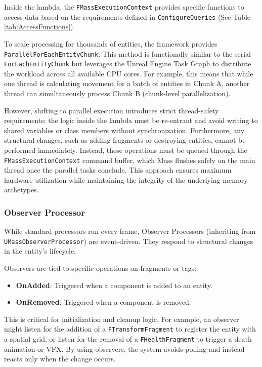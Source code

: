 Inside the lambda, the \texttt{FMassExecutionContext} provides specific functions to access data based on the requirements defined in \texttt{ConfigureQueries} (See Table \ref{tab:AccessFunctions}).

To scale processing for thousands of entities, the framework provides \\ \texttt{ParallelForEachEntityChunk}. This method is functionally similar to the serial \texttt{ForEachEntityChunk} but leverages the Unreal Engine Task Graph to distribute the workload across all available CPU cores. For example, this means that while one thread is calculating movement for a batch of entities in Chunk A, another thread can simultaneously process Chunk B (chunk-level parallelization).

However, shifting to parallel execution introduces strict thread-safety requirements: the logic inside the lambda must be re-entrant and avoid writing to shared variables or class members without synchronization. Furthermore, any structural changes, such as adding fragments or destroying entities, cannot be performed immediately. Instead, these operations must be queued through the \texttt{FMassExecutionContext} command buffer, which Mass flushes safely on the main thread once the parallel tasks conclude. This approach ensures maximum hardware utilization while maintaining the integrity of the underlying memory archetypes.

\subsubsection{Observer Processor}

While standard processors run every frame, Observer Processors (inheriting from \texttt{UMassObserverProcessor}) are event-driven. They respond to structural changes in the entity's lifecycle.

Observers are tied to specific operations on fragments or tags:

\begin{itemize}
    \item \textbf{OnAdded}: Triggered when a component is added to an entity.
    \item \textbf{OnRemoved}: Triggered when a component is removed.
\end{itemize}

This is critical for initialization and cleanup logic. For example, an observer might listen for the addition of a \texttt{FTransformFragment} to register the entity with a spatial grid, or listen for the removal of a \texttt{FHealthFragment} to trigger a death animation or VFX. By using observers, the system avoids polling and instead reacts only when the change occurs. 

